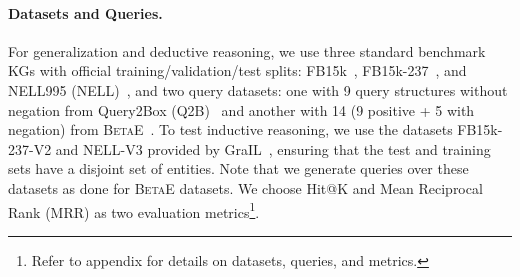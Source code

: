 \vic{Our aim is to analyse the impact of adding \textsc{Temp} to existing QE models on their %
generalization, deductive and inductive reasoning abilities.}



\paragraph{Datasets and Queries.} 
For generalization and deductive reasoning, we use three standard benchmark KGs with official training/validation/test splits: FB15k~\cite{bordes2013translating}, FB15k-237~\cite{toutanova2015observed}, and NELL995 (NELL)~\cite{xiong2017deeppath}, and two query datasets: one with 9  query structures without negation from Query2Box (\textsc{Q2B})~\cite{query2box:ren2020} and another with 14  (9 positive + 5 with negation) from \textsc{BetaE}~\cite{ren2020beta}. To test inductive reasoning, we use the  datasets FB15k-237-V2 and NELL-V3 provided by GraIL~\cite{teru2020inductive},  ensuring that the test and training sets have a disjoint set of entities. Note that we generate queries over these datasets as done for \textsc{BetaE} datasets. We choose Hit@K and Mean Reciprocal Rank (MRR) as two evaluation metrics\footnote{Refer to appendix for  details on datasets, queries, and  metrics.}.
%

